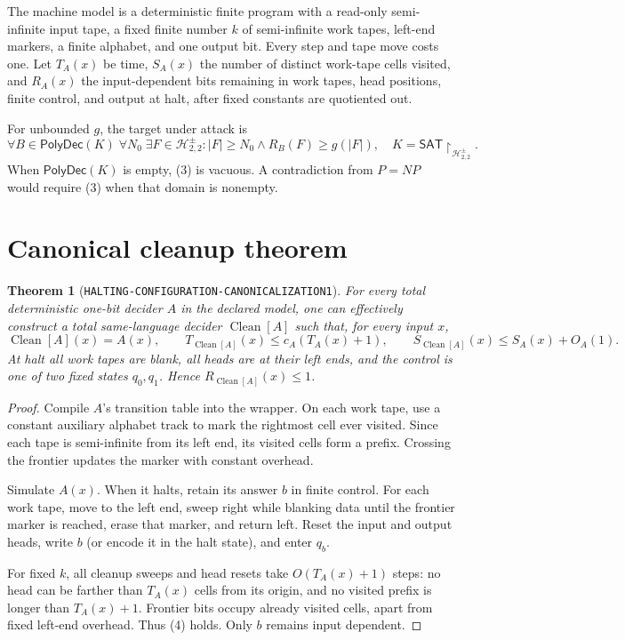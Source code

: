 \documentclass[11pt]{article}
\newtheorem{theorem}{Theorem}
\newcommand{\SAT}{\mathsf{SAT}}
\newcommand{\PolyDec}{\mathsf{PolyDec}}
\begin{document}
The machine model is a deterministic finite program with a read-only
semi-infinite input tape, a fixed finite number \(k\) of semi-infinite work
tapes, left-end markers, a finite alphabet, and one output bit. Every step
and tape move costs one. Let \(T_A(x)\) be time, \(S_A(x)\) the number of
distinct work-tape cells visited, and \(R_A(x)\) the input-dependent bits
remaining in work tapes, head positions, finite control, and output at halt,
after fixed constants are quotiented out.

For unbounded \(g\), the target under attack is
\[
 \forall B\in\PolyDec(K)\;\forall N_0\;\exists F\in\mathcal H_{2,2}^{\pm}:
 |F|\ge N_0\land R_B(F)\ge g(|F|),
 \quad K=\SAT\!\upharpoonright_{\mathcal H_{2,2}^{\pm}}. \tag{3}
\]
When \(\PolyDec(K)\) is empty, (3) is vacuous. A contradiction from \(P=NP\)
would require (3) when that domain is nonempty.

\section{Canonical cleanup theorem}
\begin{theorem}[\texttt{HALTING-CONFIGURATION-CANONICALIZATION1}]
For every total deterministic one-bit decider \(A\) in the declared model,
one can effectively construct a total same-language decider
\(\operatorname{Clean}[A]\) such that, for every input \(x\),
\[
 \operatorname{Clean}[A](x)=A(x),\qquad
 T_{\operatorname{Clean}[A]}(x)\le c_A(T_A(x)+1),\qquad
 S_{\operatorname{Clean}[A]}(x)\le S_A(x)+O_A(1). \tag{4}
\]
At halt all work tapes are blank, all heads are at their left ends, and the
control is one of two fixed states \(q_0,q_1\). Hence
\(R_{\operatorname{Clean}[A]}(x)\le1\).
\end{theorem}
\begin{proof}
Compile \(A\)'s transition table into the wrapper. On each work tape, use a
constant auxiliary alphabet track to mark the rightmost cell ever visited.
Since each tape is semi-infinite from its left end, its visited cells form a
prefix. Crossing the frontier updates the marker with constant overhead.

Simulate \(A(x)\). When it halts, retain its answer \(b\) in finite control.
For each work tape, move to the left end, sweep right while blanking data
until the frontier marker is reached, erase that marker, and return left.
Reset the input and output heads, write \(b\) (or encode it in the halt
state), and enter \(q_b\).

For fixed \(k\), all cleanup sweeps and head resets take \(O(T_A(x)+1)\)
steps: no head can be farther than \(T_A(x)\) cells from its origin, and no
visited prefix is longer than \(T_A(x)+1\). Frontier bits occupy already
visited cells, apart from fixed left-end overhead. Thus (4) holds. Only
\(b\) remains input dependent.
\end{proof}
\end{document}
